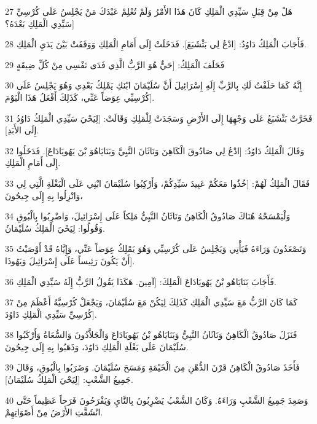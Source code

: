 \par 27 هَلْ مِنْ قِبَلِ سَيِّدِي الْمَلِكِ كَانَ هَذَا الأَمْرُ وَلَمْ تُعْلِمْ عَبْدَكَ مَنْ يَجْلِسُ عَلَى كُرْسِيِّ سَيِّدِي الْمَلِكِ بَعْدَهُ؟]
\par 28 فَأَجَابَ الْمَلِكُ دَاوُدُ: [ادْعُ لِي بَثْشَبَعَ]. فَدَخَلَتْ إِلَى أَمَامِ الْمَلِكِ وَوَقَفَتْ بَيْنَ يَدَيِ الْمَلِكِ.
\par 29 فَحَلَفَ الْمَلِكُ: [حَيٌّ هُوَ الرَّبُّ الَّذِي فَدَى نَفْسِي مِنْ كُلِّ ضِيقَةٍ
\par 30 إِنَّهُ كَمَا حَلَفْتُ لَكِ بِالرَّبِّ إِلَهِ إِسْرَائِيلَ أَنَّ سُلَيْمَانَ ابْنَكِ يَمْلِكُ بَعْدِي وَهُوَ يَجْلِسُ عَلَى كُرْسِيِّي عِوَضاً عَنِّي، كَذَلِكَ أَفْعَلُ هَذَا الْيَوْمَ].
\par 31 فَخَرَّتْ بَثْشَبَعُ عَلَى وَجْهِهَا إِلَى الأَرْضِ وَسَجَدَتْ لِلْمَلِكِ وَقَالَتْ: [لِيَحْيَ سَيِّدِي الْمَلِكُ دَاوُدُ إِلَى الأَبَدِ].
\par 32 وَقَالَ الْمَلِكُ دَاوُدُ: [ادْعُ لِي صَادُوقَ الْكَاهِنَ وَنَاثَانَ النَّبِيَّ وَبَنَايَاهُوَ بْنَ يَهُويَادَاعَ]. فَدَخَلُوا إِلَى أَمَامِ الْمَلِكِ.
\par 33 فَقَالَ الْمَلِكُ لَهُمْ: [خُذُوا مَعَكُمْ عَبِيدَ سَيِّدِكُمْ، وَأَرْكِبُوا سُلَيْمَانَ ابْنِي عَلَى الْبَغْلَةِ الَّتِي لِي وَانْزِلُوا بِهِ إِلَى جِيحُونَ،
\par 34 وَلْيَمْسَحْهُ هُنَاكَ صَادُوقُ الْكَاهِنُ وَنَاثَانُ النَّبِيُّ مَلِكاً عَلَى إِسْرَائِيلَ، وَاضْرِبُوا بِالْبُوقِ وَقُولُوا: لِيَحْيَ الْمَلِكُ سُلَيْمَانُ.
\par 35 وَتَصْعَدُونَ وَرَاءَهُ فَيَأْتِي وَيَجْلِسُ عَلَى كُرْسِيِّي وَهُوَ يَمْلِكُ عِوَضاً عَنِّي، وَإِيَّاهُ قَدْ أَوْصَيْتُ أَنْ يَكُونَ رَئِيساً عَلَى إِسْرَائِيلَ وَيَهُوذَا].
\par 36 فَأَجَابَ بَنَايَاهُو بْنُ يَهُويَادَاعَ الْمَلِكَ: [آمِينَ. هَكَذَا يَقُولُ الرَّبُّ إِلَهُ سَيِّدِي الْمَلِكِ.
\par 37 كَمَا كَانَ الرَّبُّ مَعَ سَيِّدِي الْمَلِكِ كَذَلِكَ لِيَكُنْ مَعَ سُلَيْمَانَ، وَيَجْعَلْ كُرْسِيَّهُ أَعْظَمَ مِنْ كُرْسِيِّ سَيِّدِي الْمَلِكِ دَاوُدَ].
\par 38 فَنَزَلَ صَادُوقُ الْكَاهِنُ وَنَاثَانُ النَّبِيُّ وَبَنَايَاهُو بْنُ يَهُويَادَاعَ وَالْجَلاَّدُونَ وَالسُّعَاةُ وَأَرْكَبُوا سُلَيْمَانَ عَلَى بَغْلَةِ الْمَلِكِ دَاوُدَ، وَذَهَبُوا بِهِ إِلَى جِيحُونَ.
\par 39 فَأَخَذَ صَادُوقُ الْكَاهِنُ قَرْنَ الدُّهْنِ مِنَ الْخَيْمَةِ وَمَسَحَ سُلَيْمَانَ. وَضَرَبُوا بِالْبُوقِ، وَقَالَ جَمِيعُ الشَّعْبِ: [لِيَحْيَ الْمَلِكُ سُلَيْمَانُ].
\par 40 وَصَعِدَ جَمِيعُ الشَّعْبِ وَرَاءَهُ. وَكَانَ الشَّعْبُ يَضْرِبُونَ بِالنَّايِ وَيَفْرَحُونَ فَرَحاً عَظِيماً حَتَّى انْشَقَّتِ الأَرْضُ مِنْ أَصْوَاتِهِمْ.
